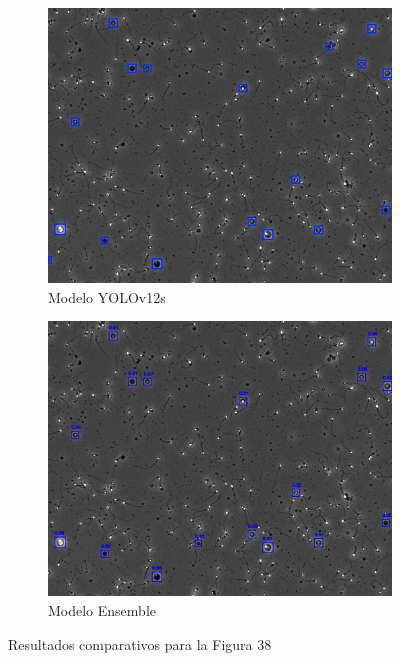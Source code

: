\documentclass[12pt,a4paper,onecolumn,oneside]{report}
\begin{document}
\begin{figure}[H]
  \vspace{0.3cm} 
  
  \begin{subfigure}[b]{0.48\textwidth}
    \centering
    \includegraphics[width=\textwidth]{figuras/evaluacion_cualitativa/38/38_v12.jpg}
    \caption{Modelo YOLOv12s}
    \label{fig:yolov12s_image_38}
  \end{subfigure}
  \hfill
  \begin{subfigure}[b]{0.48\textwidth}
    \centering
    \includegraphics[width=\textwidth]{figuras/evaluacion_cualitativa/38/38_ensemble.jpg}
    \caption{Modelo Ensemble}
    \label{fig:ensemble_image_38}
  \end{subfigure}
  
  \caption{Resultados comparativos para la Figura 38}
  \label{fig:38}
\end{figure}
\end{document}
